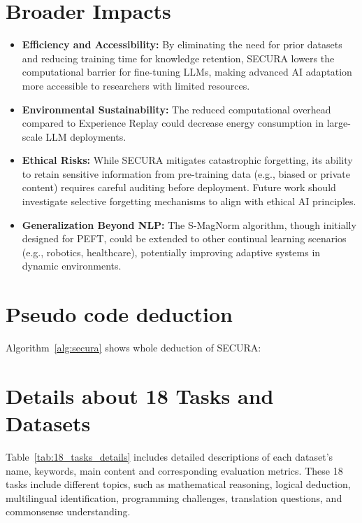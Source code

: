 \section{Broader Impacts}
\begin{itemize}
    \item \textbf{Efficiency and Accessibility:} By eliminating the need for prior datasets and reducing training time for knowledge retention, SECURA lowers the computational barrier for fine-tuning LLMs, making advanced AI adaptation more accessible to researchers with limited resources.
    
    \item \textbf{Environmental Sustainability:} The reduced computational overhead  compared to Experience Replay could decrease energy consumption in large-scale LLM deployments.
    
    \item \textbf{Ethical Risks:} While SECURA mitigates catastrophic forgetting, its ability to retain sensitive information from pre-training data (e.g., biased or private content) requires careful auditing before deployment. Future work should investigate selective forgetting mechanisms to align with ethical AI principles.
    
    \item \textbf{Generalization Beyond NLP:} The S-MagNorm algorithm, though initially designed for PEFT, could be extended to other continual learning scenarios (e.g., robotics, healthcare), potentially improving adaptive systems in dynamic environments.
\end{itemize}


\section{Pseudo code deduction}\label{app:Pseudo}
Algorithm~\ref{alg:secura} shows whole deduction of SECURA:


\section{Details about 18 Tasks and Datasets}\label{app:18_datasets}
Table~\ref{tab:18_tasks_details} includes detailed descriptions of each dataset's name, keywords, main content and corresponding evaluation metrics. These 18 tasks include different topics, such as mathematical reasoning,  logical deduction,  multilingual identification,  programming challenges,  translation questions,  and commonsense understanding.

